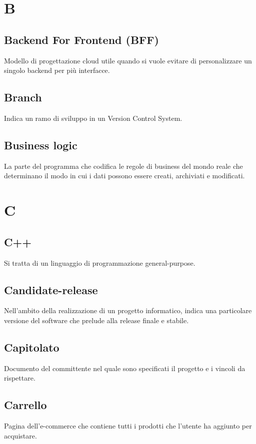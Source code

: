 \newpage
\section{B}
\subsection*{Backend For Frontend (BFF)}
Modello di progettazione cloud utile quando si vuole evitare di personalizzare un singolo backend per più interfacce.

\subsection*{Branch}
Indica un ramo di sviluppo in un Version Control System.

\subsection*{Business logic}
La parte del programma che codifica le regole di business del mondo reale che determinano il modo in cui i dati possono essere creati, archiviati e modificati.

\newpage
\section{C}
\subsection*{C++}
Si tratta di un linguaggio di programmazione general-purpose.

\subsection*{Candidate-release}
Nell'ambito della realizzazione di un progetto informatico, indica una particolare versione del software che prelude alla release finale e stabile.

\subsection*{Capitolato}
Documento del committente nel quale sono specificati il progetto e i vincoli da rispettare. 
\subsection*{Carrello}
Pagina dell'e-commerce che contiene tutti i prodotti che l'utente ha aggiunto per acquistare.

